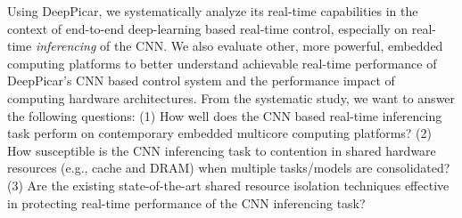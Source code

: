 
Using DeepPicar, we systematically analyze its real-time
capabilities in the context of end-to-end deep-learning based real-time
control, especially on real-time \emph{inferencing} of the CNN.
We also evaluate other, more powerful, embedded computing
platforms to better understand achievable real-time performance of
DeepPicar's CNN based control system and the performance impact of
computing hardware architectures.
From the systematic study, we want to answer the following questions:
(1) How well does the CNN based real-time inferencing task perform on
contemporary embedded multicore computing platforms? (2) How
susceptible is the CNN inferencing task to contention in shared
hardware resources (e.g., cache and DRAM) when multiple tasks/models
are consolidated? (3) Are the existing state-of-the-art shared resource
isolation techniques effective in protecting real-time performance of
the CNN inferencing task?

